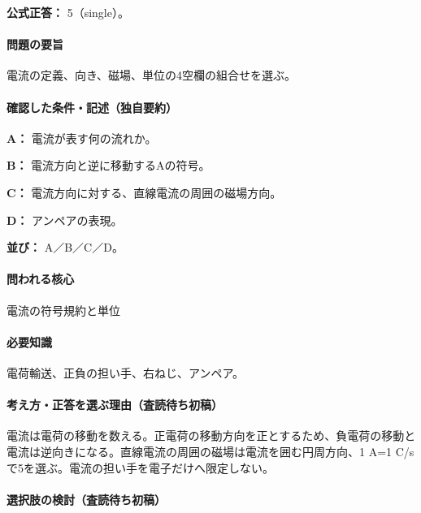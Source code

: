 \textbf{公式正答：} 5（single）。

\paragraph{問題の要旨} 電流の定義、向き、磁場、単位の4空欄の組合せを選ぶ。

\paragraph{確認した条件・記述（独自要約）}\mbox{}\par

\noindent\textbf{A：} 電流が表す何の流れか。\par

\noindent\textbf{B：} 電流方向と逆に移動するAの符号。\par

\noindent\textbf{C：} 電流方向に対する、直線電流の周囲の磁場方向。\par

\noindent\textbf{D：} アンペアの表現。\par

\noindent\textbf{並び：} A／B／C／D。\par

\paragraph{問われる核心} 電流の符号規約と単位

\paragraph{必要知識} 電荷輸送、正負の担い手、右ねじ、アンペア。

\paragraph{考え方・正答を選ぶ理由（査読待ち初稿）} 電流は電荷の移動を数える。正電荷の移動方向を正とするため、負電荷の移動と電流は逆向きになる。直線電流の周囲の磁場は電流を囲む円周方向、1 A=\allowbreak{}1 C/sで5を選ぶ。電流の担い手を電子だけへ限定しない。

\paragraph{選択肢の検討（査読待ち初稿）}\mbox{}\par

